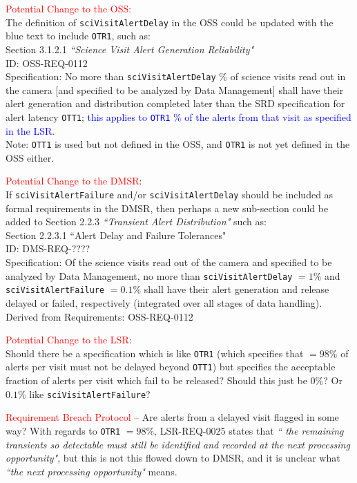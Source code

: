 \documentclass[DM,authoryear,toc]{lsstdoc}
\begin{document}
\textcolor{red}{Potential Change to the OSS:}\\
The definition of {\tt sciVisitAlertDelay} in the OSS could be updated with the blue text to include {\tt OTR1}, such as: \\ 
Section 3.1.2.1 {\it ``Science Visit Alert Generation Reliability"} \\
ID: OSS-REQ-0112 \\
Specification: No more than {\tt sciVisitAlertDelay} \% of science visits read out in the camera [and specified to be analyzed by Data Management] shall have their alert generation and distribution completed later than the SRD specification for alert latency {\tt OTT1}; \textcolor{blue}{this applies to {\tt OTR1} \% of the alerts from that visit as specified in the LSR.} \\
Note: {\tt OTT1} is used but not defined in the OSS, and {\tt OTR1} is not yet defined in the OSS either.

\textcolor{red}{Potential Change to the DMSR}: \\
If {\tt sciVisitAlertFailure} and/or {\tt sciVisitAlertDelay} should be included as formal requirements in the DMSR, then perhaps a new sub-section could be added to Section 2.2.3 {\it ``Transient Alert Distribution"} such as: \\
Section 2.2.3.1 ``Alert Delay and Failure Tolerances" \\
ID: DMS-REQ-???? \\
Specification: Of the science visits read out of the camera and specified to be analyzed by Data Management, no more than {\tt sciVisitAlertDelay} $=1\%$ and {\tt sciVisitAlertFailure} $=0.1\%$ shall have their alert generation and release delayed or failed, respectively (integrated over all stages of data handling). \\
Derived from Requirements: OSS-REQ-0112

\textcolor{red}{Potential Change to the LSR:}\\
Should there be a specification which is like {\tt OTR1} (which specifies that $=98\%$ of alerts per visit must not be delayed beyond {\tt OTT1}) but specifies the acceptable fraction of alerts per visit which fail to be released? Should this just be $0\%$? Or $0.1\%$ like {\tt sciVisitAlertFailure}?

\textcolor{red}{Requirement Breach Protocol --} Are alerts from a delayed visit flagged in some way? With regards to {\tt OTR1} $=98\%$, LSR-REQ-0025 states that {\it `` the remaining transients so detectable must still be identified and recorded at the next processing opportunity"}, but this is not this flowed down to DMSR, and it is unclear what {\it ``the next processing opportunity"} means.
\end{document}
